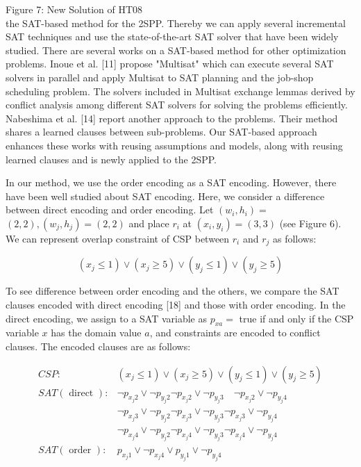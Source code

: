 \documentclass[10pt]{article}
\begin{document}
Figure 7: New Solution of HT08\\[0pt]
the SAT-based method for the 2SPP. Thereby we can apply several incremental SAT techniques and use the state-of-the-art SAT solver that have been widely studied. There are several works on a SAT-based method for other optimization problems. Inoue et al. [11] propose "Multisat" which can execute several SAT solvers in parallel and apply Multisat to SAT planning and the job-shop scheduling problem. The solvers included in Multisat exchange lemmas derived by conflict analysis among different SAT solvers for solving the problems efficiently. Nabeshima et al. [14] report another approach to the problems. Their method shares a learned clauses between sub-problems. Our SAT-based approach enhances these works with reusing assumptions and models, along with reusing learned clauses and is newly applied to the 2SPP.

In our method, we use the order encoding as a SAT encoding. However, there have been well studied about SAT encoding. Here, we consider a difference between direct encoding and order encoding. Let $\left(w_{i}, h_{i}\right)=$ $(2,2),\left(w_{j}, h_{j}\right)=(2,2)$ and place $r_{i}$ at $\left(x_{i}, y_{i}\right)=(3,3)$ (see Figure 6). We can represent overlap constraint of CSP between $r_{i}$ and $r_{j}$ as follows:

$$
\left(x_{j} \leq 1\right) \vee\left(x_{j} \geq 5\right) \vee\left(y_{j} \leq 1\right) \vee\left(y_{j} \geq 5\right)
$$

To see difference between order encoding and the others, we compare the SAT clauses encoded with direct encoding [18] and those with order encoding. In the direct encoding, we assign to a SAT variable as $p_{x a}=$ true if and only if the CSP variable $x$ has the domain value $a$, and constraints are encoded to conflict clauses. The encoded clauses are as follows:

$$
\begin{aligned}
C S P: & \left(x_{j} \leq 1\right) \vee\left(x_{j} \geq 5\right) \vee\left(y_{j} \leq 1\right) \vee\left(y_{j} \geq 5\right) \\
S A T(\text { direct }): & \neg p_{x_{j} 2} \vee \neg p_{y_{j} 2} \neg p_{x_{j} 2} \vee \neg p_{y_{j} 3} \quad \neg p_{x_{j} 2} \vee \neg p_{y_{j} 4} \\
& \neg p_{x_{j} 3} \vee \neg p_{y_{j} 2} \neg p_{x_{j} 3} \vee \neg p_{y_{j} 3} \neg p_{x_{j} 3} \vee \neg p_{y_{j} 4} \\
& \neg p_{x_{j} 4} \vee \neg p_{y_{j} 2} \neg p_{x_{j} 4} \vee \neg p_{y_{j} 3} \neg p_{x_{j} 4} \vee \neg p_{y_{j} 4} \\
S A T(\text { order }): & p_{x_{j} 1} \vee \neg p_{x_{j} 4} \vee p_{y_{j} 1} \vee \neg p_{y_{j} 4}
\end{aligned}
$$
\end{document}
